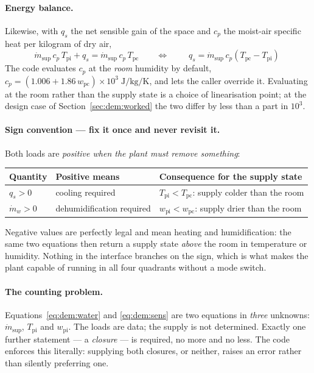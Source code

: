 \documentclass[11pt]{article}
\newcommand{\md}{\ensuremath{\dot m}}
\newcommand{\mdw}{\ensuremath{\dot m_{w}}}
\newcommand{\qs}{\ensuremath{q_{s}}}
\begin{document}
\paragraph{Energy balance.} Likewise, with $\qs$ the net sensible gain of the
space and $c_p$ the moist-air specific heat per kilogram of dry air,
\begin{equation}
\md_{\mathrm{sup}}\,c_p\,T_{\mathrm{pi}}+\qs=\md_{\mathrm{sup}}\,c_p\,T_{\mathrm{pc}}
\qquad\Longleftrightarrow\qquad
\boxed{\;\qs=\md_{\mathrm{sup}}\,c_p\left(T_{\mathrm{pc}}-T_{\mathrm{pi}}\right)\;}
\label{eq:dem:sens}
\end{equation}
The code evaluates $c_p$ at the \emph{room} humidity by default,
$c_p=(1.006+1.86\,w_{\mathrm{pc}})\times10^{3}\;\si{\joule\per\kilogram\per\kelvin}$,
and lets the caller override it. Evaluating at the room rather than the supply
state is a choice of linearisation point; at the design case of
Section~\ref{sec:dem:worked} the two differ by less than a part in $10^{3}$.

\paragraph{Sign convention --- fix it once and never revisit it.}
Both loads are \emph{positive when the plant must remove something}:
\begin{center}
\begin{tabular}{@{}lll@{}}
\toprule
Quantity & Positive means & Consequence for the supply state \\
\midrule
$\qs>0$   & cooling required        & $T_{\mathrm{pi}}<T_{\mathrm{pc}}$: supply colder than the room \\
$\mdw>0$  & dehumidification required & $w_{\mathrm{pi}}<w_{\mathrm{pc}}$: supply drier than the room \\
\bottomrule
\end{tabular}
\end{center}
Negative values are perfectly legal and mean heating and humidification: the
same two equations then return a supply state \emph{above} the room in
temperature or humidity. Nothing in the interface branches on the sign, which is
what makes the plant capable of running in all four quadrants without a mode
switch.

\paragraph{The counting problem.} Equations~\eqref{eq:dem:water} and
\eqref{eq:dem:sens} are two equations in \emph{three} unknowns:
$\md_{\mathrm{sup}}$, $T_{\mathrm{pi}}$ and $w_{\mathrm{pi}}$. The loads are
data; the supply is not determined. Exactly one further statement --- a
\emph{closure} --- is required, no more and no less. The code enforces this
literally: supplying both closures, or neither, raises an error rather than
silently preferring one.
\end{document}
